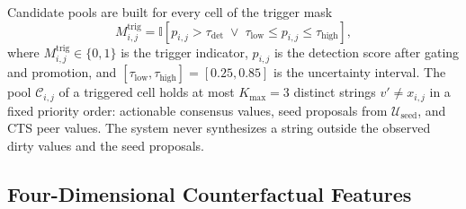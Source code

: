 \documentclass[conference]{IEEEtran}
\begin{document}
Candidate pools are built for every cell of the trigger mask
\begin{equation}
\label{eq:trigger_mask}
M_{i,j}^{\mathrm{trig}} = \mathbb{I}\!\left[p_{i,j} > \tau_{\mathrm{det}} \;\lor\; \tau_{\mathrm{low}} \le p_{i,j} \le \tau_{\mathrm{high}}\right],
\end{equation}
where $M_{i,j}^{\mathrm{trig}} \in \{0,1\}$ is the trigger indicator, $p_{i,j}$ is the detection score after gating and promotion, and $[\tau_{\mathrm{low}}, \tau_{\mathrm{high}}] = [0.25, 0.85]$ is the uncertainty interval. The pool $\mathcal{C}_{i,j}$ of a triggered cell holds at most $K_{\max} = 3$ distinct strings $v' \neq x_{i,j}$ in a fixed priority order: actionable consensus values, seed proposals from $\mathcal{U}_{\mathrm{seed}}$, and CTS peer values. The system never synthesizes a string outside the observed dirty values and the seed proposals.

\subsection{Four-Dimensional Counterfactual Features}
\label{subsec:rep_counterfactual}
\end{document}
